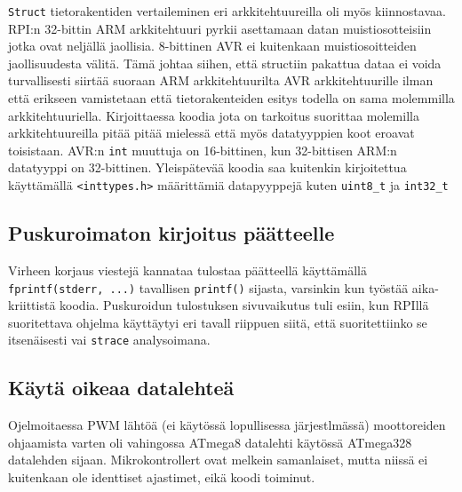 \documentclass[]{article} %
\numberwithin{equation}{section}
\numberwithin{figure}{section}
\numberwithin{table}{section}
\begin{document}
\verb+Struct+ tietorakentiden vertaileminen eri arkkitehtuureilla oli myös kiinnostavaa.
RPI:n 32-bittin ARM arkkitehtuuri pyrkii asettamaan datan muistiosotteisiin jotka ovat neljällä jaollisia. 8-bittinen AVR ei kuitenkaan muistiosoitteiden jaollisuudesta välitä.
Tämä johtaa siihen, että structiin pakattua dataa ei voida turvallisesti siirtää suoraan ARM arkkitehtuurilta AVR arkkitehtuurille ilman että erikseen vamistetaan että tietorakenteiden esitys todella on sama molemmilla arkkitehtuuriella.
Kirjoittaessa koodia jota on tarkoitus suorittaa molemilla arkkitehtuureilla pitää pitää mielessä että myös datatyyppien koot eroavat toisistaan. AVR:n \verb+int+ muuttuja on 16-bittinen, kun 32-bittisen ARM:n datatyyppi on 32-bittinen.
Yleispätevää koodia saa kuitenkin kirjoitettua käyttämällä \verb+<inttypes.h>+ määrittämiä datapyyppejä kuten \verb+uint8_t+ ja \verb+int32_t+

\subsection{Puskuroimaton kirjoitus päätteelle}
\label{sub:Puskuroimaton kirjoitus paatteelle}

Virheen korjaus viestejä kannataa tulostaa päätteellä käyttämällä \verb+fprintf(stderr, ...)+ tavallisen \verb+printf()+ sijasta, varsinkin kun työstää aika-kriittistä koodia. Puskuroidun tulostuksen sivuvaikutus tuli esiin, kun RPIllä suoritettava ohjelma käyttäytyi eri tavall riippuen siitä, että suoritettiinko se itsenäisesti vai \verb+strace+ analysoimana. 

  
\subsection{Käytä oikeaa datalehteä}
\label{sub:Kayta oikeaa datalehtea}


Ojelmoitaessa PWM lähtöä (ei käytössä lopullisessa järjestlmässä) moottoreiden ohjaamista varten oli vahingossa ATmega8 datalehti käytössä ATmega328 datalehden sijaan. Mikrokontrollert ovat melkein samanlaiset, mutta niissä ei kuitenkaan ole identtiset ajastimet, eikä koodi toiminut. 
\end{document}
